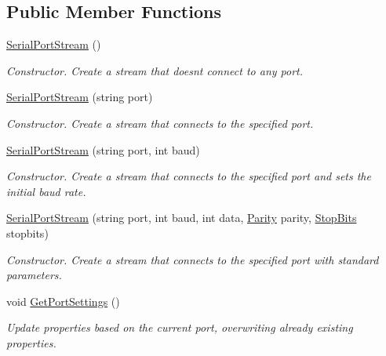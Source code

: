 \subsection*{Public Member Functions}
\begin{DoxyCompactItemize}
\item 
\mbox{\hyperlink{class_r_j_c_p_1_1_i_o_1_1_ports_1_1_serial_port_stream_ad504b01f384f56eb186ab105f93a92da}{Serial\+Port\+Stream}} ()
\begin{DoxyCompactList}\small\item\em Constructor. Create a stream that doesn\textquotesingle{}t connect to any port. \end{DoxyCompactList}\item 
\mbox{\hyperlink{class_r_j_c_p_1_1_i_o_1_1_ports_1_1_serial_port_stream_a14acec7bd25051984f46db2011d714bd}{Serial\+Port\+Stream}} (string port)
\begin{DoxyCompactList}\small\item\em Constructor. Create a stream that connects to the specified port. \end{DoxyCompactList}\item 
\mbox{\hyperlink{class_r_j_c_p_1_1_i_o_1_1_ports_1_1_serial_port_stream_a099de0b3186770e7b217a0627bf9a7a4}{Serial\+Port\+Stream}} (string port, int baud)
\begin{DoxyCompactList}\small\item\em Constructor. Create a stream that connects to the specified port and sets the initial baud rate. \end{DoxyCompactList}\item 
\mbox{\hyperlink{class_r_j_c_p_1_1_i_o_1_1_ports_1_1_serial_port_stream_a312ee3a066ded257a78d3e8e0e096542}{Serial\+Port\+Stream}} (string port, int baud, int data, \mbox{\hyperlink{namespace_r_j_c_p_1_1_i_o_1_1_ports_a35c8c760a80dd0392e605dd3ad169954}{Parity}} parity, \mbox{\hyperlink{namespace_r_j_c_p_1_1_i_o_1_1_ports_a56a13b591d46736acafe20f2976c84fa}{Stop\+Bits}} stopbits)
\begin{DoxyCompactList}\small\item\em Constructor. Create a stream that connects to the specified port with standard parameters. \end{DoxyCompactList}\item 
void \mbox{\hyperlink{class_r_j_c_p_1_1_i_o_1_1_ports_1_1_serial_port_stream_ab46149075be4eb8bc5d914439757d43e}{Get\+Port\+Settings}} ()
\begin{DoxyCompactList}\small\item\em Update properties based on the current port, overwriting already existing properties. \end{DoxyCompactList}\item 

\end{DoxyCompactItemize}
